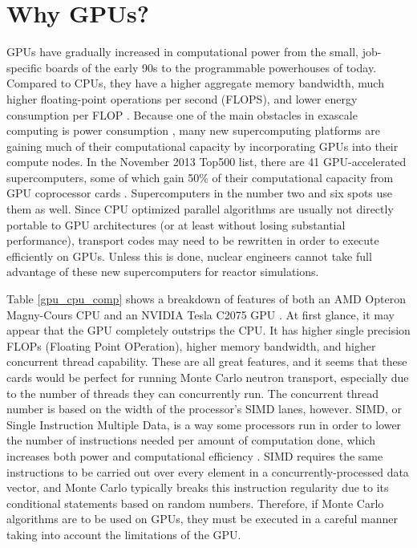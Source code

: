 \section{Why GPUs?}

GPUs have gradually increased in computational power from the small, job-specific boards of the early 90s to the programmable powerhouses of today.  Compared to CPUs, they have a higher aggregate memory bandwidth, much higher floating-point operations per second (FLOPS), and lower energy consumption per FLOP \cite{cuda}.  Because one of the main obstacles in exascale computing is power consumption \cite{exascale}, many new supercomputing platforms are gaining much of their computational capacity by incorporating GPUs into their compute nodes.  In the November 2013 Top500 list, there are 41 GPU-accelerated supercomputers, some of which gain 50\% of their computational capacity from GPU coprocessor cards \cite{top500}.  Supercomputers in the number two and six spots use them as well.  Since CPU optimized parallel algorithms are usually not directly portable to GPU architectures (or at least without losing substantial performance), transport codes may need to be rewritten in order to execute efficiently on GPUs.  Unless this is done, nuclear engineers cannot take full advantage of these new supercomputers for reactor simulations.

Table \ref{gpu_cpu_comp} shows a breakdown of features of both an AMD Opteron Magny-Cours CPU and an NVIDIA Tesla C2075 GPU \cite{cent, cpu_latency}.  At first glance, it may appear that the GPU completely outstrips the CPU.  It has higher single precision FLOPs (Floating Point OPeration), higher memory bandwidth, and higher concurrent thread capability.  These are all great features, and it seems that these cards would be perfect for running Monte Carlo neutron transport, especially due to the number of threads they can concurrently run.  The concurrent thread number is based on the width of the processor's SIMD lanes, however.  SIMD, or Single Instruction Multiple Data, is a way some processors run in order to lower the number of instructions needed per amount of computation done, which increases both power and computational efficiency \cite{}.  SIMD requires the same instructions to be carried out over every element  in a concurrently-processed data vector, and Monte Carlo typically breaks this instruction regularity due to its conditional statements based on random numbers.  Therefore, if Monte Carlo algorithms are to be used on GPUs, they must be executed in a careful manner taking into account the limitations of the GPU.

